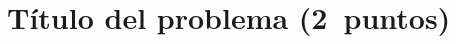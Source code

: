 \documentclass[11pt,a4paper,twoside,spanish,solution]{teaching}
\begin{document}

\section{Título del problema (2~puntos)}
\end{document}

